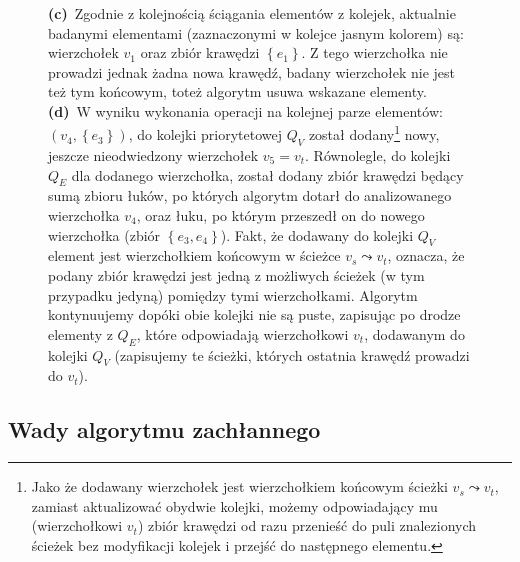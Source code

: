 \begin{savenotes}
\begin{figure}
{			\textbf{(c)}~Zgodnie z kolejnością ściągania elementów z kolejek, aktualnie badanymi elementami (zaznaczonymi w kolejce jasnym kolorem) są: wierzchołek $v_{1}$ oraz zbiór krawędzi $\left\{ e_{1} \right\}$. Z tego wierzchołka nie prowadzi jednak żadna nowa krawędź, badany wierzchołek nie jest też tym końcowym, toteż algorytm usuwa wskazane elementy.
			\textbf{(d)}~W wyniku wykonania operacji na kolejnej parze elementów: $\left( v_{4}, \left\{ e_{3} \right\} \right)$, do kolejki priorytetowej $Q_{V}$ został dodany\footnote{Jako że dodawany wierzchołek jest wierzchołkiem końcowym ścieżki $v_{s} \leadsto v_{t}$, zamiast aktualizować obydwie kolejki, możemy odpowiadający mu (wierzchołkowi $v_{t}$) zbiór krawędzi od razu przenieść do puli znalezionych ścieżek bez modyfikacji kolejek i przejść do następnego elementu.} nowy, jeszcze nieodwiedzony wierzchołek $v_{5} = v_{t}$. Równolegle, do kolejki $Q_{E}$ dla dodanego wierzchołka, został dodany zbiór krawędzi będący sumą zbioru łuków, po których algorytm dotarł do analizowanego wierzchołka $v_{4}$, oraz łuku, po którym przeszedł on do nowego wierzchołka (zbiór $\left\{ e_{3}, e_{4} \right\}$). Fakt, że dodawany do kolejki $Q_{V}$ element jest wierzchołkiem końcowym w ścieżce $v_{s} \leadsto v_{t}$, oznacza, że podany zbiór krawędzi jest jedną z możliwych ścieżek (w tym przypadku jedyną) pomiędzy tymi wierzchołkami. Algorytm kontynuujemy dopóki obie kolejki nie są puste, zapisując po drodze elementy z $Q_{E}$, które odpowiadają wierzchołkowi $v_{t}$, dodawanym do kolejki $Q_{V}$ (zapisujemy te ścieżki, których ostatnia krawędź prowadzi do $v_{t}$).
		}
		\label{fig:bfsExample}
	\end{figure}
\end{savenotes}

\subsection{Wady algorytmu zachłannego}

